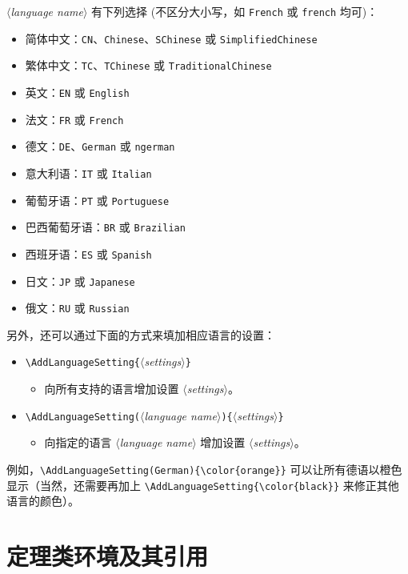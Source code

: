 \documentclass[puretext]{simplivre}
\providecommand{\meta}[1]{$\langle${\normalfont\itshape#1}$\rangle$}
\begin{document}
\meta{language name} 有下列选择 (不区分大小写，如 \texttt{French} 或 \texttt{french} 均可)：
\begin{itemize}
    \item 简体中文：\texttt{CN}、\texttt{Chinese}、\texttt{SChinese} 或 \texttt{SimplifiedChinese}
    \item 繁体中文：\texttt{TC}、\texttt{TChinese} 或 \texttt{TraditionalChinese}
    \item 英文：\texttt{EN} 或 \texttt{English}
    \item 法文：\texttt{FR} 或 \texttt{French}
    \item 德文：\texttt{DE}、\texttt{German} 或 \texttt{ngerman}
    \item 意大利语：\texttt{IT} 或 \texttt{Italian}
    \item 葡萄牙语：\texttt{PT} 或 \texttt{Portuguese}
    \item 巴西葡萄牙语：\texttt{BR} 或 \texttt{Brazilian}
    \item 西班牙语：\texttt{ES} 或 \texttt{Spanish}
    \item 日文：\texttt{JP} 或 \texttt{Japanese}
    \item 俄文：\texttt{RU} 或 \texttt{Russian}
\end{itemize}

另外，还可以通过下面的方式来填加相应语言的设置：
\begin{itemize}
    \item \lstinline|\AddLanguageSetting{|\meta{settings}\lstinline|}|
    \begin{itemize}
        \item 向所有支持的语言增加设置 \meta{settings}。
    \end{itemize}
    \item \lstinline|\AddLanguageSetting(|\meta{language name}\lstinline|){|\meta{settings}\lstinline|}|
    \begin{itemize}
        \item 向指定的语言 \meta{language name} 增加设置 \meta{settings}。
    \end{itemize}
\end{itemize}
例如，\lstinline|\AddLanguageSetting(German){\color{orange}}| 可以让所有德语以橙色显示（当然，还需要再加上 \lstinline|\AddLanguageSetting{\color{black}}| 来修正其他语言的颜色）。


\section{定理类环境及其引用}
\end{document}
